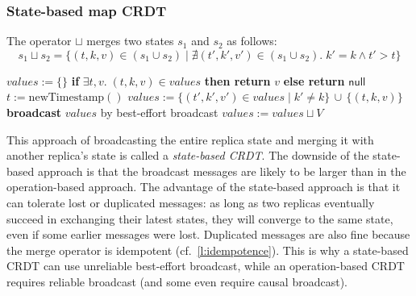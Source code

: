 \begin{frame}
    \label{s:state-crdt-map}
    \frametitle{State-based map CRDT}
    \footnotesize
    The operator $\sqcup$ merges two states $s_1$ and $s_2$ as follows:
    \[ s_1 \sqcup s_2 = \{(t,k,v) \in (s_1 \cup s_2) \mid \nexists (t',k',v') \in (s_1 \cup s_2).\; k' = k \wedge t' > t\} \]
    \begin{algorithmic}
            \State $\mathit{values} := \{\}$
        \EndOn
        \State
            \State \textbf{if} $\exists t,v.\; (t,k,v) \in \mathit{values}$ \textbf{then return} $v$ \textbf{else return} $\mathsf{null}$
        \EndOn
        \State
            \State $t := \mathrm{newTimestamp}()$ 
            \State $\mathit{values} := \{(t',k',v') \in \mathit{values} \mid k' \neq k\} \,\cup\, \{(t,k,v)\}$
            \State \textbf{broadcast} $\mathit{values}$ by best-effort broadcast
        \EndOn
        \State
            \State $\mathit{values} := \mathit{values} \sqcup V$
        \EndOn
    \end{algorithmic}
\end{frame}
\label{l:state-crdt-map}

This approach of broadcasting the entire replica state and merging it with another replica's state is called a \emph{state-based CRDT}.
The downside of the state-based approach is that the broadcast messages are likely to be larger than in the operation-based approach.
The advantage of the state-based approach is that it can tolerate lost or duplicated messages: as long as two replicas eventually succeed in exchanging their latest states, they will converge to the same state, even if some earlier messages were lost.
Duplicated messages are also fine because the merge operator is idempotent (cf.\ \autoref{l:idempotence}).
This is why a state-based CRDT can use unreliable best-effort broadcast, while an operation-based CRDT requires reliable broadcast (and some even require causal broadcast).

